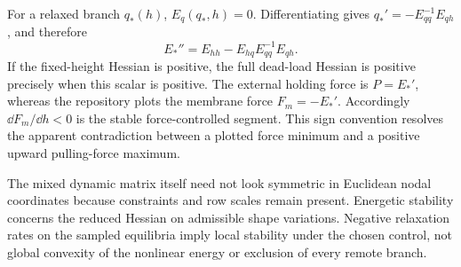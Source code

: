 For a relaxed branch $q_*(h)$, $E_q(q_*,h)=0$. Differentiating gives $q_*'=-E_{qq}^{-1}E_{qh}$, and therefore
\begin{equation}
E_*''=E_{hh}-E_{hq}E_{qq}^{-1}E_{qh}.
\end{equation}
If the fixed-height Hessian is positive, the full dead-load Hessian is positive precisely when this scalar is positive. The external holding force is $P=E_*'$, whereas the repository plots the membrane force $F_m=-E_*'$. Accordingly $\dd F_m/\dd h<0$ is the stable force-controlled segment. This sign convention resolves the apparent contradiction between a plotted force minimum and a positive upward pulling-force maximum.

The mixed dynamic matrix itself need not look symmetric in Euclidean nodal coordinates because constraints and row scales remain present. Energetic stability concerns the reduced Hessian on admissible shape variations. Negative relaxation rates on the sampled equilibria imply local stability under the chosen control, not global convexity of the nonlinear energy or exclusion of every remote branch.








